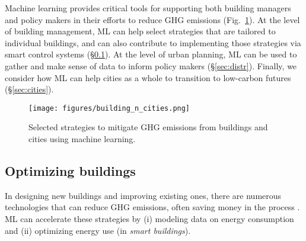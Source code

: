 \documentclass[11pt]{report}
\begin{document}
Machine learning provides critical tools for supporting both building managers and  policy makers in their efforts to reduce GHG emissions (Fig.~\ref{fig:buildingsncities}). At the level of building management, ML can help select strategies that are tailored to individual buildings, and can also contribute to implementing those strategies via smart control systems (\S\ref{sec:indv}). At the level of urban planning, ML can be used to gather and make sense of data to inform policy makers (\S\ref{sec:distr}). Finally, we consider how ML can help cities as a whole to transition to low-carbon futures (\S\ref{sec:cities}).  

\begin{figure}
    \centering
    \texttt{[image: figures/building\_n\_cities.png]}
    \caption{Selected strategies to mitigate GHG emissions from buildings and cities using machine learning.}
    \label{fig:buildingsncities}
\end{figure}

\subsection{Optimizing buildings}\label{sec:indv}
In designing new buildings and improving existing ones, there are numerous technologies that can reduce GHG emissions, often saving money in the process \cite{lucon_buildings_2014,urge2013energy,OLSTHOORN20191382,STEPHENSON20106120,Gershenfeld:2010aa}. ML can accelerate these strategies by (i) modeling data on energy consumption and (ii) optimizing energy use (in \emph{smart buildings}). 
 
\end{document}
